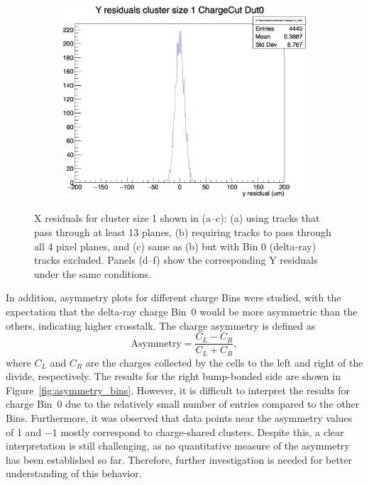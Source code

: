 \begin{figure}[H]
\begin{subfigure}[b]{0.3\textwidth}
        \includegraphics[width=\textwidth]{images/YRes_size1_4pixel_noBin0.png}
        \caption{}
    \end{subfigure}

    \caption{X residuals for cluster size 1 shown in (a--c): (a) using tracks that pass through at least 13 planes, (b) requiring tracks to pass through all 4 pixel planes, and (c) same as (b) but with Bin 0 (delta-ray) tracks excluded. Panels (d--f) show the corresponding Y residuals under the same conditions.}
    \label{fig:X_Y_Residual_size_1_planes}
\end{figure}

In addition, asymmetry plots for different charge Bins were studied, with the expectation that the delta-ray charge Bin~0 would be more asymmetric than the others, indicating higher crosstalk. The charge asymmetry is defined as
\[
\text{Asymmetry} = \frac{C_L - C_R}{C_L + C_R},
\]
where \( C_L \) and \( C_R \) are the charges collected by the cells to the left and right of the divide, respectively. The results for the right bump-bonded side are shown in Figure~\ref{fig:asymmetry_bins}. However, it is difficult to interpret the results for charge Bin~0 due to the relatively small number of entries compared to the other Bins. Furthermore, it was observed that data points near the asymmetry values of 1 and $-1$ mostly correspond to charge-shared clusters. Despite this, a clear interpretation is still challenging, as no quantitative measure of the asymmetry has been established so far. Therefore, further investigation is needed for better understanding of this behavior.

